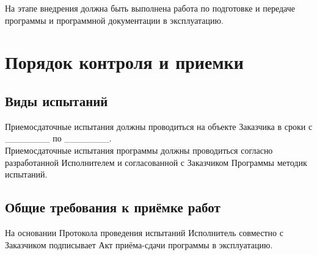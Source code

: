     На этапе внедрения должна быть выполнена работа по подготовке и передаче программы и программной документации в эксплуатацию.

\section{Порядок контроля и приемки}
  \subsection{Виды испытаний}
    Приемосдаточные испытания должны проводиться на объекте Заказчика в сроки с _______ по _______.\\
    Приемосдаточные испытания программы должны проводиться согласно разработанной Исполнителем и согласованной с Заказчиком Программы методик испытаний.
  \subsection{Общие требования к приёмке работ}
    На основании Протокола проведения испытаний Исполнитель совместно с Заказчиком подписывает Акт приёма-сдачи программы в эксплуатацию.
\endinput
